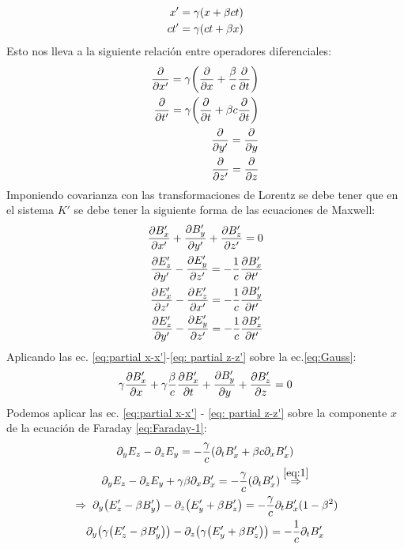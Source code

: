 \documentclass[11pt]{article}
\begin{document}
\begin{eqnarray}
    x' = \gamma \qty(x + \beta ct)\\
    ct' = \gamma \qty (ct + \beta x)
\end{eqnarray}
Esto nos lleva a la siguiente relación entre operadores diferenciales: 
\begin{eqnarray}
    \pdv{x'} = \gamma \qty(\pdv{x} + \dfrac{\beta}{c}\pdv{t})\label{eq:partial x-x'}\\
    \pdv{t'} = \gamma \qty(\pdv{t} + \beta c \pdv{t}) \label{eq:partial t-t'}\\
    \pdv{y'} = \pdv{y} \label{eq: partial y-y'}\\
    \pdv{z'} = \pdv{z} \label{eq: partial z-z'}
\end{eqnarray}
Imponiendo covarianza con las transformaciones de Lorentz se debe tener que en el sistema $K'$ se debe tener la siguiente forma de las ecuaciones de Maxwell: 
\begin{eqnarray}
    \pdv{B'_x}{x'} + \pdv{B'_y}{y'} + \pdv{B'_z}{z'} = 0 \label{eq:Gauss}\\
    \pdv{E'_z}{y'} - \pdv{E'_y}{z'} = -\dfrac{1}{c}\pdv{B'_x}{t'}\label{eq:Faraday-1}\\
    \pdv{E'_x}{z'} - \pdv{E'_z}{x'} = -\dfrac{1}{c}\pdv{B'_y}{t'}\label{eq:Faraday-2}\\
    \pdv{E'_z}{y'} - \pdv{E'_y}{z'} = -\dfrac{1}{c}\pdv{B'_z}{t'}\label{eq:Faraday-3}
\end{eqnarray}
Aplicando las ec. \eqref{eq:partial x-x'}-\eqref{eq: partial z-z'} sobre la ec.\eqref{eq:Gauss}: 
\begin{equation}
    \gamma\pdv{B'_x}{x} + \gamma \dfrac{\beta}{c}\pdv{B'_x}{t} + \pdv{B'_y}{y} + \pdv{B'_z}{z} = 0 \label{eq:1}
\end{equation}
Podemos aplicar las ec. \eqref{eq:partial x-x'} - \eqref{eq: partial z-z'} sobre la componente $x$ de la ecuación de Faraday \eqref{eq:Faraday-1}: 
\begin{gather}
    \partial_y E_z - \partial_z E_y = -\dfrac{\gamma}{c}\qty(\partial_t B'_x + \beta c \partial_x B'_x)\nonumber\\
    \partial_y E_z - \partial_z E_y  + \gamma\beta \partial_x B'_x = -\dfrac{\gamma}{c} \qty(\partial_t B'_x)  \overset{\eqref{eq:1}}{\;\Rightarrow\;}\nonumber\\
    \;\Rightarrow\; \partial_y\qty(E'_z -\beta B'_y) - \partial_z\qty(E'_y + \beta B'_z) = -\dfrac{\gamma}{c}\partial_t B'_x (1-\beta^2 )\nonumber\\
    \partial_y\qty(\gamma\qty(E'_z - \beta B'_y)) - \partial_z\qty(\gamma \qty(E'_y + \beta B'_z))= -\dfrac{1}{c} \partial_t B'_x \label{eq:Faraday-1-fin} 
\end{gather}
\end{document}
